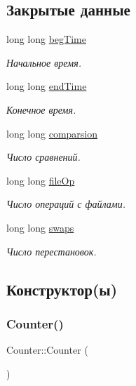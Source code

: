 \subsection*{Закрытые данные}
\begin{DoxyCompactItemize}
\item 
long long \hyperlink{class_counter_ae2f8fa6947d7daa4b977d4aae2ee3c43}{beg\+Time}
\begin{DoxyCompactList}\small\item\em Начальное время. \end{DoxyCompactList}\item 
long long \hyperlink{class_counter_a961ca391c9a8e3ac0efb8d6d61d734d4}{end\+Time}
\begin{DoxyCompactList}\small\item\em Конечное время. \end{DoxyCompactList}\item 
long long \hyperlink{class_counter_a20f5a772c02412c338457dcc85c4a543}{comparsion}
\begin{DoxyCompactList}\small\item\em Число сравнений. \end{DoxyCompactList}\item 
long long \hyperlink{class_counter_abc197117fc99ab93bebc483059ae0fbc}{file\+Op}
\begin{DoxyCompactList}\small\item\em Число операций с файлами. \end{DoxyCompactList}\item 
long long \hyperlink{class_counter_a2a5ee961a25c6eb87d1ad02bcef4ade1}{swaps}
\begin{DoxyCompactList}\small\item\em Число перестановок. \end{DoxyCompactList}\end{DoxyCompactItemize}


\subsection{Конструктор(ы)}
\hypertarget{class_counter_a1e05f69b5240fbab3e7ab351672167f0}{}\label{class_counter_a1e05f69b5240fbab3e7ab351672167f0} 
\subsubsection{\texorpdfstring{Counter()}{Counter()}}
{\footnotesize\ttfamily Counter\+::\+Counter (\begin{DoxyParamCaption}{ }\end{DoxyParamCaption})}



